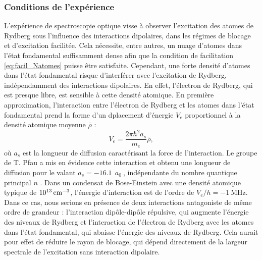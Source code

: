 	\subsubsection*{Conditions de l'expérience}
\noindent	L'expérience de spectroscopie optique visse à observer l'excitation des atomes de Rydberg sous l'influence des interactions dipolaires, dans les régimes de blocage et d'excitation facilitée.
Cela nécessite, entre autres, un nuage d'atomes dans l'état fondamental suffisamment dense afin que la condition de facilitation \eqref{eq:facil_Natomes} puisse être satisfaite.
Cependant, une forte densité d'atomes dans l'état fondamental risque d'interférer avec l'excitation de Rydberg, indépendamment des interactions dipolaires.
En effet, l'électron de Rydberg, qui est presque libre, est sensible à cette densité atomique.
En première approximation, l'interaction entre l'électron de Rydberg et les atomes dans l'état fondamental prend la forme d'un dplacement d'énergie $V_e$ proportionnel à la densité atomique moyenne $\bar{\rho}$ \cite{MX_PFAURYDBERGBEC13} :
\begin{equation}
\label{eq:Pfau_shift}
V_e = \frac{2\pi \hbar ^2 a_s}{m_e} \bar{\rho},
\end{equation}
où $a_s$ est la longueur de diffusion caractérisant la force de l'interaction.
Le groupe de T. Pfau a mis en évidence cette interaction et obtenu une longueur de diffusion pour le  valant $a_s = -\SI{16.1}{}~a_0~$, indépendante du nombre quantique principal $n$ \cite{MX_PFAURYDBERGBEC13}.
Dans un condensat de Bose-Einstein avec une densité atomique typique de $\SI{e13}{\per \raiseto{3}\centi\meter}$, l'énergie d'interaction est de l'ordre de $V_e/h = -\SI{1}{\MHz}$.
Dans ce cas, nous serions en présence de deux interactions antagoniste de même ordre de grandeur : l'interaction dipôle-dipôle répulsive, qui augmente l'énergie des niveaux de Rydberg et l'interaction de l'électron de Rydberg avec les atomes dans l'état fondamental, qui abaisse l'énergie des niveaux de Rydberg.
Cela aurait pour effet de réduire le rayon de blocage, qui dépend directement de la largeur spectrale de l'excitation sans interaction dipolaire.

